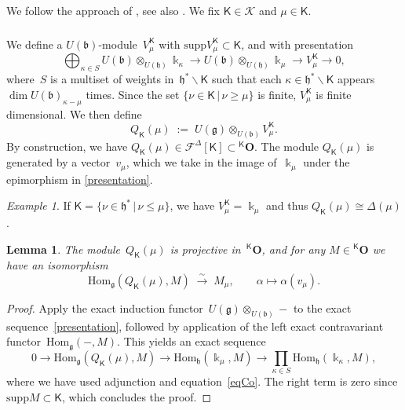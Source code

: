 \documentclass[11pt]{amsart}
\newcommand{\cK}{\mathcal{K}}
\newcommand{\KKK}{\mathsf{K}}
\newcommand{\cF}{{\mathcal{F}}}
\newcommand{\supp}{\mathrm{supp}}
\newcommand{\bO}{\mathbf{O}}
\newcommand{\Hom}{\mathrm{Hom}}
\newcommand{\mk}{\Bbbk}
\newcommand{\fg}{\mathfrak{g}}
\newcommand{\fh}{\mathfrak{h}}
\newcommand{\fb}{\mathfrak{b}}
\numberwithin{equation}{section}
\theoremstyle{plain}
\newtheorem{lemma}[subsubsection]{Lemma}
\theoremstyle{remark}
\theoremstyle{remark}
\newtheorem{ex}[subsubsection]{Example}
\theoremstyle{construction}
\begin{document}
We follow the approach of \cite[Section~4]{BGG}, see also \cite{CM}. We fix $\KKK\in\cK$ and $\mu\in \KKK$.

\subsubsection{}\label{DefQ} 
We define a $U(\fb)$-module~$V_\mu^{\KKK}$ with $\supp V_\mu^{\KKK}\subset \KKK${, and} with presentation
\begin{equation}\label{presentation}\bigoplus_{\kappa\in S}U(\fb)\otimes_{U(\fh)}\mk_\kappa\to U(\fb)\otimes_{U(\fh)}\mk_\mu\to V_\mu^{\KKK}\to 0 ,\end{equation}
where~$S$ is a multiset of weights in~$\fh^\ast\backslash \KKK$ such that each $\kappa\in\fh^\ast\backslash \KKK$ appears $\dim U(\fb)_{\kappa-\mu}$ times.
Since the set
$\{\nu\in\KKK\,|\,\nu\ge \mu\}$
is finite, $V_\mu^{\KKK}$ is finite dimensional.
We then define
$$Q_{\KKK}(\mu)\;:=\;U(\fg)\otimes_{U(\fb)} V_\mu^{\KKK}.$$
By construction, we have $Q_{\KKK}(\mu)\in\cF^{\Delta}[\KKK]\subset {}^{\KKK}\bO$. The module $Q_{\KKK}(\mu)$ is generated by a vector~$v_\mu$, which we take in the image of~$\mk_\mu$ under the epimorphism in \eqref{presentation}.

\begin{ex}If $\KKK=\{\nu\in\fh^\ast\,|\,\nu\le \mu\}$, we have $V_\mu^{\KKK}=\mk_\mu$ and thus ${Q}_{\KKK}(\mu)\cong \Delta(\mu)$.
\end{ex}



\begin{lemma}\label{Qk}
The module~$Q_{\KKK}(\mu)$ is projective in~${}^{\KKK}\bO${,} and for any $M\in {}^{\KKK}{\bO}$ we have an isomorphism
$$\Hom_{\fg}(Q_{\KKK}(\mu),M)\;\stackrel{\sim}{\to}\;M_{\mu},\qquad \alpha\mapsto \alpha(v_\mu).$$
\end{lemma}
\begin{proof}
Apply the exact induction functor~$U(\fg)\otimes_{U(\fb)}-$ to the exact sequence~\eqref{presentation}, followed by application of the left exact contravariant functor~$\Hom_{\fg}(-,M)$. This yields an exact sequence
$$0\to \Hom_{\fg}(Q_{\KKK}(\mu),M)\to \Hom_{\fh}(\mk_\mu,M)\to \prod_{\kappa\in S}\Hom_{\fh}(\mk_\kappa,M),$$
where we have used adjunction and equation~\eqref{eqCo}.
The right term is zero since $\supp M \subset \KKK$, which concludes the proof.
\end{proof}
\end{document}
